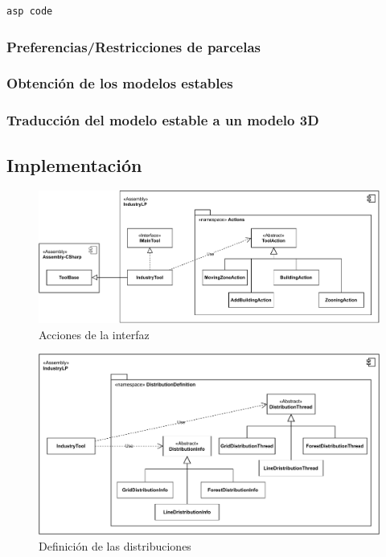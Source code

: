 \begin{lstlisting}[label=lst:def]
	asp code
\end{lstlisting}

\subsubsection{Preferencias/Restricciones de parcelas}

\subsubsection{Obtención de los modelos estables}

\subsubsection{Traducción del modelo estable a un modelo 3D}

\subsection{Implementación}
\label{subsec:implementacion}

\begin{figure}[!h]
	\centering
	\includegraphics[width=\textwidth]{images/actions}
	\caption{Acciones de la interfaz}
	\label{fig:actions}
\end{figure}

\begin{figure}[!h]
	\centering
	\includegraphics[width=\textwidth]{images/distribuciones}
	\caption{Definición de las distribuciones}
	\label{fig:distributions}
\end{figure}

